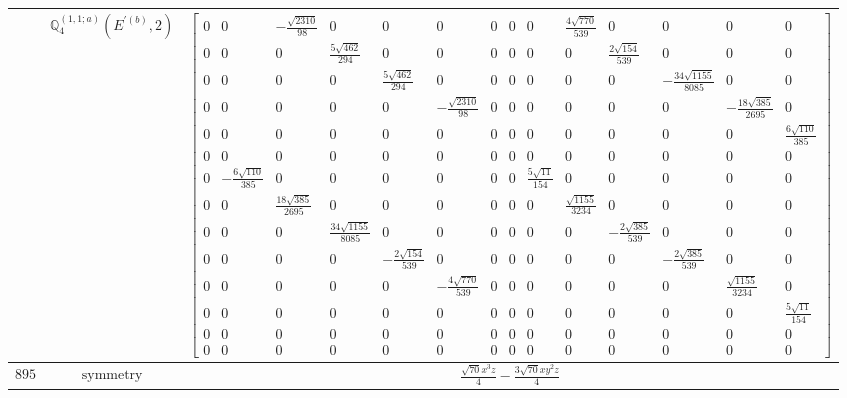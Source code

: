 \documentclass[fleqn,8pt,landscape]{jsarticle}
\begin{document}
\begin{longtable}{ccc}
$  $ & $ \mathbb{Q}_{4}^{(1,1;a)}(E^{\prime(b)},2) $ & $ \begin{bmatrix} 0 & 0 & - \frac{\sqrt{2310}}{98} & 0 & 0 & 0 & 0 & 0 & 0 & \frac{4 \sqrt{770}}{539} & 0 & 0 & 0 & 0 \\ 0 & 0 & 0 & \frac{5 \sqrt{462}}{294} & 0 & 0 & 0 & 0 & 0 & 0 & \frac{2 \sqrt{154}}{539} & 0 & 0 & 0 \\ 0 & 0 & 0 & 0 & \frac{5 \sqrt{462}}{294} & 0 & 0 & 0 & 0 & 0 & 0 & - \frac{34 \sqrt{1155}}{8085} & 0 & 0 \\ 0 & 0 & 0 & 0 & 0 & - \frac{\sqrt{2310}}{98} & 0 & 0 & 0 & 0 & 0 & 0 & - \frac{18 \sqrt{385}}{2695} & 0 \\ 0 & 0 & 0 & 0 & 0 & 0 & 0 & 0 & 0 & 0 & 0 & 0 & 0 & \frac{6 \sqrt{110}}{385} \\ 0 & 0 & 0 & 0 & 0 & 0 & 0 & 0 & 0 & 0 & 0 & 0 & 0 & 0 \\ 0 & - \frac{6 \sqrt{110}}{385} & 0 & 0 & 0 & 0 & 0 & 0 & \frac{5 \sqrt{11}}{154} & 0 & 0 & 0 & 0 & 0 \\ 0 & 0 & \frac{18 \sqrt{385}}{2695} & 0 & 0 & 0 & 0 & 0 & 0 & \frac{\sqrt{1155}}{3234} & 0 & 0 & 0 & 0 \\ 0 & 0 & 0 & \frac{34 \sqrt{1155}}{8085} & 0 & 0 & 0 & 0 & 0 & 0 & - \frac{2 \sqrt{385}}{539} & 0 & 0 & 0 \\ 0 & 0 & 0 & 0 & - \frac{2 \sqrt{154}}{539} & 0 & 0 & 0 & 0 & 0 & 0 & - \frac{2 \sqrt{385}}{539} & 0 & 0 \\ 0 & 0 & 0 & 0 & 0 & - \frac{4 \sqrt{770}}{539} & 0 & 0 & 0 & 0 & 0 & 0 & \frac{\sqrt{1155}}{3234} & 0 \\ 0 & 0 & 0 & 0 & 0 & 0 & 0 & 0 & 0 & 0 & 0 & 0 & 0 & \frac{5 \sqrt{11}}{154} \\ 0 & 0 & 0 & 0 & 0 & 0 & 0 & 0 & 0 & 0 & 0 & 0 & 0 & 0 \\ 0 & 0 & 0 & 0 & 0 & 0 & 0 & 0 & 0 & 0 & 0 & 0 & 0 & 0 \end{bmatrix} $ \\ \hline
$ 895 $ & $ \text{symmetry} $ & $ \frac{\sqrt{70} x^{3} z}{4} - \frac{3 \sqrt{70} x y^{2} z}{4} $ \\

\end{longtable}
\end{document}
